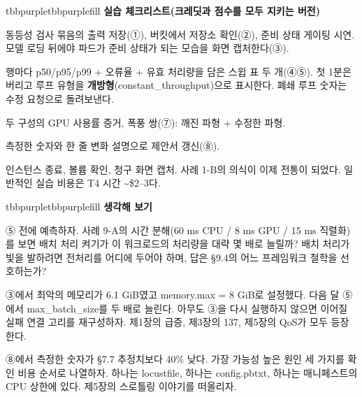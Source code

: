 \begin{calloutbox}{tbbpurple}{tbbpurplefill}
{\normalsize\bfseries\color{tbbpurple}실습 체크리스트(크레딧과 점수를 모두 지키는 버전)}\par\vspace{3pt}
\begin{tbbitemize}
  \item 동등성 검사 묶음의 출력 저장(①), 버킷에서 저장소 확인(②), 준비 상태 게이팅 시연. 모델 로딩 뒤에야 파드가 준비 상태가 되는 모습을 화면 캡처한다(③).
  \item 행마다 p50/p95/p99 + 오류율 + 유효 처리량을 담은 스윕 표 두 개(④⑤). 첫 1분은 버리고 루프 유형을 \textbf{개방형}(constant\_throughput)으로 표시한다. 폐쇄 루프 숫자는 수정 요청으로 돌려보낸다.
  \item 두 구성의 GPU 사용률 증거, 폭풍 쌍(⑦): 깨진 파형 + 수정한 파형.
  \item 측정한 숫자와 한 줄 변화 설명으로 제안서 갱신(⑧).
  \item 인스턴스 종료, 볼륨 확인, 청구 화면 캡처. 사례 1-B의 의식이 이제 전통이 되었다. 일반적인 실습 비용은 T4 시간 \textasciitilde{}\$2–3다.
\end{tbbitemize}
\end{calloutbox}

\vspace{3.0pt}

\begin{calloutbox}{tbbpurple}{tbbpurplefill}
{\normalsize\bfseries\color{tbbpurple}생각해 보기}\par\vspace{3pt}
\begin{tbbitemize}
  \item ⑤ 전에 예측하자. 사례 9-A의 시간 분해(60 ms CPU / 8 ms GPU / 15 ms 직렬화)를 보면 배치 처리 켜기가 이 워크로드의 처리량을 대략 몇 배로 늘릴까? 배치 처리가 빛을 발하려면 전처리를 어디에 두어야 하며, 답은 §9.4의 어느 프레임워크 철학을 선호하는가?
  \item ③에서 최악의 메모리가 6.1 GiB였고 memory.max = 8 GiB로 설정했다. 다음 달 ⑤에서 max\_batch\_size를 두 배로 늘린다. 아무도 ③을 다시 실행하지 않으면 이어질 실패 연결 고리를 재구성하자. 제1장의 급증, 제3장의 137, 제5장의 QoS가 모두 등장한다.
  \item ⑧에서 측정한 숫자가 §7.7 추정치보다 40\% 낮다. 가장 가능성 높은 원인 세 가지를 확인 비용 순서로 나열하자. 하나는 locustfile, 하나는 config.pbtxt, 하나는 매니페스트의 CPU 상한에 있다. 제5장의 스로틀링 이야기를 떠올리자.
\end{tbbitemize}
\end{calloutbox}

